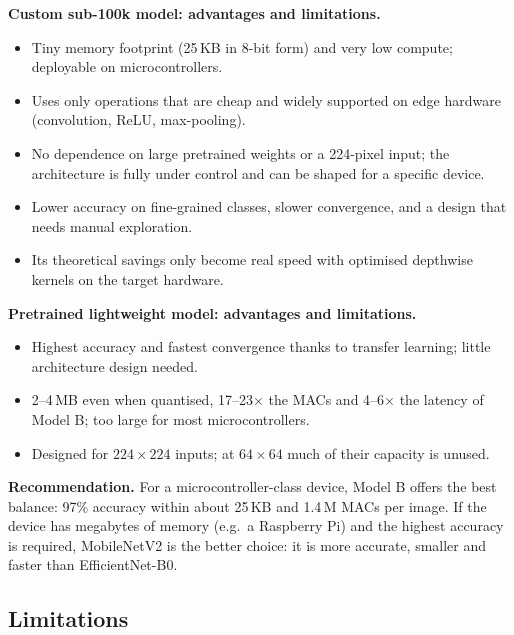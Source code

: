 \documentclass[11pt, a4paper]{article}
\begin{document}
\medskip
{}
\noindent\textbf{Custom sub-100k model: advantages and limitations.}
\begin{itemize}
    \item[+] Tiny memory footprint (25\,KB in 8-bit form) and very low compute; deployable on microcontrollers.
    \item[+] Uses only operations that are cheap and widely supported on edge hardware (convolution, ReLU, max-pooling).
    \item[+] No dependence on large pretrained weights or a 224-pixel input; the architecture is fully under control
          and can be shaped for a specific device.
    \item[--] Lower accuracy on fine-grained classes, slower convergence, and a design that needs manual exploration.
    \item[--] Its theoretical savings only become real speed with optimised depthwise kernels on the target hardware.
\end{itemize}

\medskip
{}
\noindent\textbf{Pretrained lightweight model: advantages and limitations.}
\begin{itemize}
    \item[+] Highest accuracy and fastest convergence thanks to transfer learning; little architecture design needed.
    \item[--] 2--4\,MB even when quantised, 17--23$\times$ the MACs and 4--6$\times$ the latency of Model B; too large
          for most microcontrollers.
    \item[--] Designed for $224 \times 224$ inputs; at $64 \times 64$ much of their capacity is unused.
\end{itemize}

\textbf{Recommendation.} For a microcontroller-class device, Model B offers the best balance: 97\% accuracy within
about 25\,KB and 1.4\,M MACs per image. If the device has megabytes of memory (e.g.\ a Raspberry Pi) and the highest
accuracy is required, MobileNetV2 is the better choice: it is more accurate, smaller and faster than EfficientNet-B0.

\subsection{Limitations}
\end{document}
